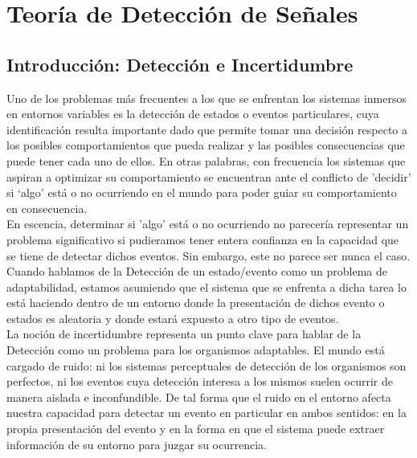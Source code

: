 
\chapter{Teoría de Detección de Señales} %

\label{Cap_SDT} %


\newcommand{\keyword}[1]{\textbf{#1}}
\newcommand{\tabhead}[1]{\textbf{#1}}
\newcommand{\code}[1]{\texttt{#1}}
\newcommand{\file}[1]{\texttt{\bfseries#1}}
\newcommand{\option}[1]{\texttt{\itshape#1}}


\section{Introducción: Detección e Incertidumbre}

Uno de los problemas más frecuentes a los que se enfrentan los sistemas inmersos en entornos variables es la detección de estados o eventos particulares, cuya identificación resulta importante dado que permite tomar una decisión respecto a los posibles comportamientos que pueda realizar y las posibles consecuencias que puede tener cada uno de ellos. En otras palabras, con frecuencia los sistemas que aspiran a optimizar su comportamiento se encuentran ante el conflicto de 'decidir' si ‘algo’ está o no ocurriendo en el mundo para poder guiar su comportamiento en consecuencia. \\

En escencia, determinar si 'algo' está o no ocurriendo no parecería representar un problema significativo si pudieramos tener entera confianza en la capacidad que se tiene de detectar dichos eventos. Sin embargo, este no parece ser nunca el caso. Cuando hablamos de la Detección de un estado/evento como un problema de adaptabilidad, estamos asumiendo que el sistema que se enfrenta a dicha tarea lo está haciendo dentro de un entorno donde la presentación de dichos evento o estados es aleatoria y donde estará expuesto a otro tipo de eventos.\\

La noción de incertidumbre representa un punto clave para hablar de la Detección como un problema para los organismos adaptables. El mundo está cargado de ruido: ni los sistemas perceptuales de detección de los organismos son perfectos, ni los eventos cuya detección interesa a los mismos suelen ocurrir de manera aislada e inconfundible. De tal forma que el ruido en el entorno afecta nuestra capacidad para detectar un evento en particular en ambos sentidos: en la propia presentación del evento y en la forma en que el sistema puede extraer información de su entorno para juzgar su ocurrencia.\\

